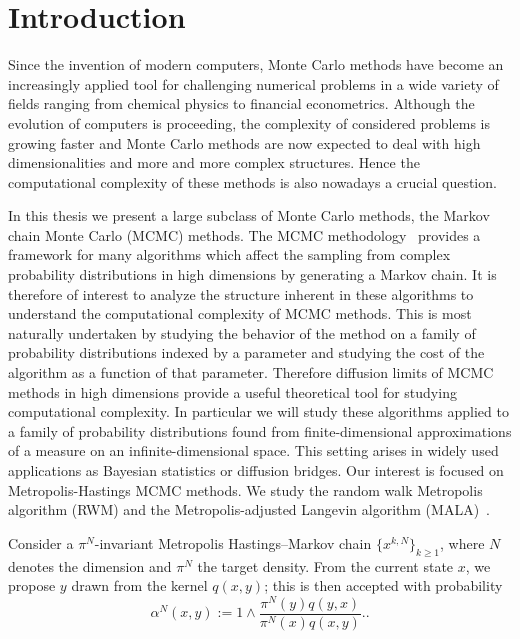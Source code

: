 \chapter{Introduction}
\label{sec:introduction}

Since the invention of modern computers, Monte Carlo methods have become an increasingly applied tool for challenging numerical problems in a wide variety of fields ranging from chemical physics to financial econometrics. Although the evolution of computers is proceeding, the complexity of considered problems is growing faster and Monte Carlo methods are now expected to deal with high dimensionalities and more and more complex structures. Hence the computational complexity of these methods is also nowadays a crucial question.

In this thesis we present a large subclass of Monte Carlo methods, the Markov chain Monte Carlo (MCMC) methods. The MCMC methodology~\autocite{Robert2005} provides a framework for many algorithms which affect the sampling from complex probability distributions in high dimensions by generating a Markov chain. It is therefore of interest to analyze the structure inherent in these algorithms to understand the computational complexity of MCMC methods. This is most naturally undertaken by studying the behavior of the method on a family of probability distributions indexed by a parameter and studying the cost of the algorithm as a function of that parameter. Therefore diffusion limits of MCMC methods in high dimensions provide a useful theoretical tool for studying computational complexity. In particular we will study these algorithms applied to a family of probability distributions found from finite-dimensional approximations of a measure on an infinite-dimensional space. This setting arises in widely used applications as Bayesian statistics or diffusion bridges.
Our interest is focused on Metropolis-Hastings MCMC methods. We study the random walk Metropolis algorithm (RWM) and the Metropolis-adjusted Langevin algorithm (MALA)~\autocite{Liu2004, Robert2005}. 

Consider a $ \pi^{N} $-invariant Metropolis Hastings–Markov chain $ \{ x^{k,N} \}_{k \geq 1} $, where $N$ denotes the dimension and $ \pi^{N} $ the target density. From the current state $ x $, we propose $ y $ drawn from the kernel $ q(x, y) $; this is then accepted with probability
\begin{equation}
\label{acceptance probability simple}
 \alpha^{N}(x,y)  := 1 \wedge \dfrac{\pi^{N}(y) q(y,x) }{\pi^{N}(x) q(x,y)}. .
\end{equation}

